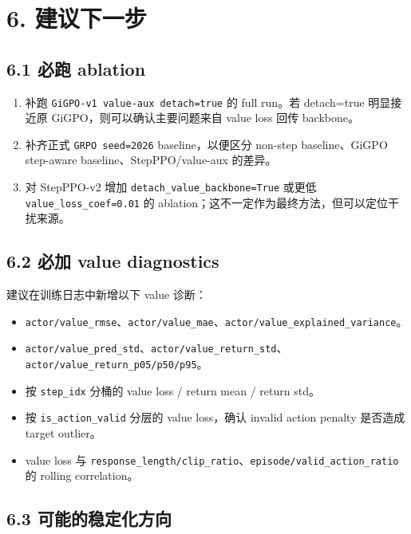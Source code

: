 \documentclass[10pt]{ctexart}
\begin{document}
\section*{6. 建议下一步}

\subsection*{6.1 必跑 ablation}

\begin{enumerate}
\item 补跑 \texttt{GiGPO-v1 value-aux detach=true} 的 full run。若 detach=true 明显接近原 GiGPO，则可以确认主要问题来自 value loss 回传 backbone。
\item 补齐正式 \texttt{GRPO seed=2026} baseline，以便区分 non-step baseline、GiGPO step-aware baseline、StepPPO/value-aux 的差异。
\item 对 StepPPO-v2 增加 \texttt{detach\_value\_backbone=True} 或更低 \texttt{value\_loss\_coef=0.01} 的 ablation；这不一定作为最终方法，但可以定位干扰来源。
\end{enumerate}

\subsection*{6.2 必加 value diagnostics}

建议在训练日志中新增以下 value 诊断：

\begin{itemize}
\item \texttt{actor/value\_rmse}、\texttt{actor/value\_mae}、\texttt{actor/value\_explained\_variance}。
\item \texttt{actor/value\_pred\_std}、\texttt{actor/value\_return\_std}、\texttt{actor/value\_return\_p05/p50/p95}。
\item 按 \texttt{step\_idx} 分桶的 value loss / return mean / return std。
\item 按 \texttt{is\_action\_valid} 分层的 value loss，确认 invalid action penalty 是否造成 target outlier。
\item value loss 与 \texttt{response\_length/clip\_ratio}、\texttt{episode/valid\_action\_ratio} 的 rolling correlation。
\end{itemize}

\subsection*{6.3 可能的稳定化方向}
\end{document}
